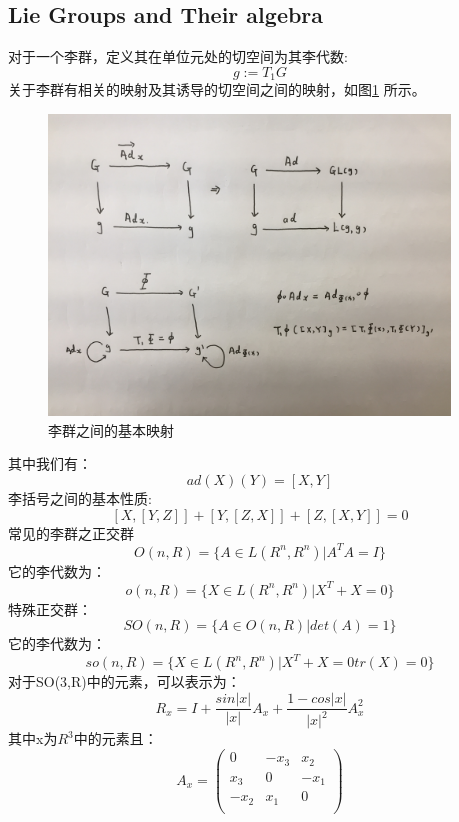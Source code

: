 \subsection{Lie Groups and Their algebra}
对于一个李群，定义其在单位元处的切空间为其李代数:
\[g:=T_1G\]
关于李群有相关的映射及其诱导的切空间之间的映射，如图\ref{fig:basicmap} 所示。
\begin{figure}
\begin{center}
\includegraphics[height=8cm]{figures/Mappings.JPG}
\caption{李群之间的基本映射}
\label{fig:basicmap}
\end{center}
\end{figure}
其中我们有：
\[ad(X)(Y)=[X,Y]\]
李括号之间的基本性质:
\[[X,[Y,Z]]+[Y,[Z,X]]+[Z,[X,Y]]=0\]
常见的李群之正交群
\[O(n,R)=\{A\in L(R^n,R^n)|A^TA=I\}\]
它的李代数为：
\[o(n,R)=\{X\in L(R^n,R^n)|X^T+X=0\}\]
特殊正交群：
\[SO(n,R)=\{A\in O(n,R)|det(A)=1\}\]
它的李代数为：
\[so(n,R)=\{X\in L(R^n,R^n)|X^T+X=0 tr(X)=0\}\]
对于SO(3,R)中的元素，可以表示为：
\[R_x=I+\frac{sin|x|}{|x|}A_x+\frac{1-cos|x|}{|x|^2}A_x^2\]
其中x为$R^3$中的元素且：
\begin{equation}
A_x=\left(\begin{array}{ccc}
0&-x_3&x_2\\
x_3&0&-x_1\\
-x_2&x_1&0\\
\end{array}
\right)
\end{equation}

